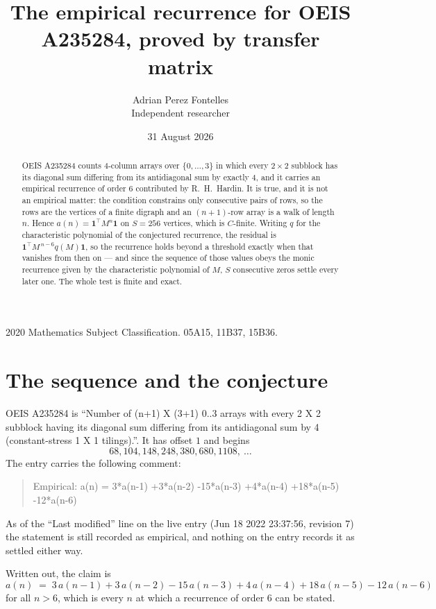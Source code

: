 \documentclass[11pt,a4paper]{article}
\title{The empirical recurrence for OEIS A235284, proved by transfer matrix}
\author{Adrian Perez Fontelles\\ \small Independent researcher}
\date{31 August 2026}
\theoremstyle{plain}
\theoremstyle{definition}
\begin{document}
\maketitle

\begin{abstract}
OEIS A235284 counts $4$-column arrays over $\{0,\dots,3\}$ in which every
$2\times2$ subblock has its diagonal sum differing from its antidiagonal sum by
exactly $4$, and it
carries an empirical recurrence of order $6$ contributed by R.~H.~Hardin. It is true,
and it is not an empirical matter: the condition constrains only consecutive pairs of rows,
so the rows are the vertices of a finite digraph and an $(n+1)$-row array is a walk of
length $n$. Hence $a(n)=\mathbf{1}^{\!\top}M^{n}\mathbf{1}$ on $S=256$ vertices, which
is $C$-finite. Writing $q$ for the characteristic polynomial of the conjectured recurrence,
the residual is $\mathbf{1}^{\!\top}M^{\,n-6}q(M)\mathbf{1}$, so the recurrence
holds beyond a threshold exactly when that vanishes from then on --- and since the sequence
of those values obeys the monic recurrence given by the characteristic polynomial of $M$,
$S$ consecutive zeros settle every later one. The whole test is finite and exact.
\end{abstract}

\noindent\small 2020 Mathematics Subject Classification. 05A15, 11B37, 15B36.\normalsize

\section{The sequence and the conjecture}

OEIS A235284 is ``Number of (n+1) X (3+1) 0..3 arrays with every 2 X 2 subblock having its diagonal sum differing from its antidiagonal sum by 4 (constant-stress 1 X 1 tilings).''. It has offset
$1$ and begins
\[
68, 104, 148, 248, 380, 680, 1108,\ \dots
\]
The entry carries the following comment:
\begin{quote}\small
Empirical: a(n) = 3*a(n-1) +3*a(n-2) -15*a(n-3) +4*a(n-4) +18*a(n-5) -12*a(n-6)
\end{quote}
As of the ``Last modified'' line on the live entry (Jun 18 2022 23:37:56, revision 7) the statement is
still recorded as empirical, and nothing on the entry records it as settled either way.

Written out, the claim is
\begin{equation}\label{eq:conj}
a(n)\;=\;3\,a(n-1) + 3\,a(n-2) - 15\,a(n-3) + 4\,a(n-4) + 18\,a(n-5) - 12\,a(n-6)
\end{equation}
for all $n>6$, which is every $n$ at which a recurrence of order $6$ can be
stated.
\end{document}

